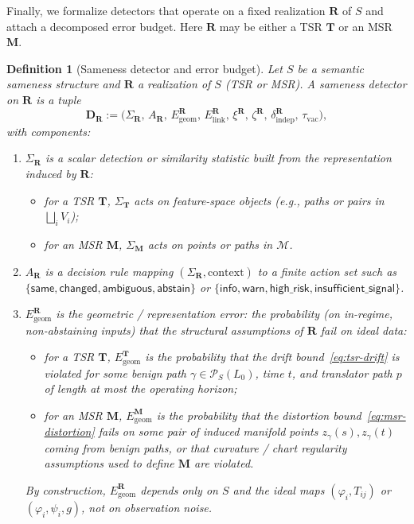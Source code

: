 \documentclass[11pt]{article}
\newtheorem{definition}{Definition}
\begin{document}
Finally, we formalize detectors that operate on a fixed realization $\mathbf{R}$ of $S$ and
attach a decomposed error budget. Here $\mathbf{R}$ may be either a TSR $\mathbf{T}$ or an
MSR $\mathbf{M}$.

\begin{definition}[Sameness detector and error budget]
\label{def:sameness-detector}
Let $S$ be a semantic sameness structure and $\mathbf{R}$ a realization of $S$ (TSR or MSR).
A \emph{sameness detector} on $\mathbf{R}$ is a tuple
\[
\mathbf{D_R}
:=
\bigl(
\Sigma_{\mathbf{R}},\,
A_{\mathbf{R}},\,
E_{\mathrm{geom}}^{\mathbf{R}},\,
E_{\mathrm{link}}^{\mathbf{R}},\,
\xi^{\mathbf{R}},\,
\zeta^{\mathbf{R}},\,
\delta_{\mathrm{indep}}^{\mathbf{R}},\,
\tau_{\mathrm{vac}}
\bigr),
\]
with components:
\begin{enumerate}[label=\textnormal{(\roman*)}, leftmargin=*]
\item $\Sigma_{\mathbf{R}}$ is a scalar \emph{detection or similarity statistic} built from the
representation induced by $\mathbf{R}$:
\begin{itemize}
\item for a TSR $\mathbf{T}$, $\Sigma_{\mathbf{T}}$ acts on feature-space objects
(e.g., paths or pairs in $\bigsqcup_i V_i$);
\item for an MSR $\mathbf{M}$, $\Sigma_{\mathbf{M}}$ acts on points or paths in $\mathcal{M}$.
\end{itemize}

\item $A_{\mathbf{R}}$ is a decision rule mapping $(\Sigma_{\mathbf{R}}, \text{context})$ to a
finite action set such as $\{\mathsf{same},\mathsf{changed},\mathsf{ambiguous},\mathsf{abstain}\}$
or $\{\mathsf{info},\mathsf{warn},\mathsf{high\_risk},\mathsf{insufficient\_signal}\}$.

\item $E_{\mathrm{geom}}^{\mathbf{R}}$ is the \emph{geometric / representation error}:
the probability (on in-regime, non-abstaining inputs) that the structural assumptions of
$\mathbf{R}$ fail on ideal data:
\begin{itemize}
\item for a TSR $\mathbf{T}$, $E_{\mathrm{geom}}^{\mathbf{T}}$ is the probability that the
drift bound~\eqref{eq:tsr-drift} is violated for some benign path $\gamma\in\mathcal{P}_S(L_0)$,
time $t$, and translator path $p$ of length at most the operating horizon;
\item for an MSR $\mathbf{M}$, $E_{\mathrm{geom}}^{\mathbf{M}}$ is the probability that the
distortion bound~\eqref{eq:msr-distortion} fails on some pair of induced manifold points
$z_\gamma(s),z_\gamma(t)$ coming from benign paths, or that curvature / chart regularity
assumptions used to define $\mathbf{M}$ are violated.
\end{itemize}
By construction, $E_{\mathrm{geom}}^{\mathbf{R}}$ depends only on $S$ and the ideal maps
$(\varphi_i, T_{ij})$ or $(\varphi_i,\psi_i,g)$, not on observation noise.


\end{enumerate}
\end{definition}
\end{document}
